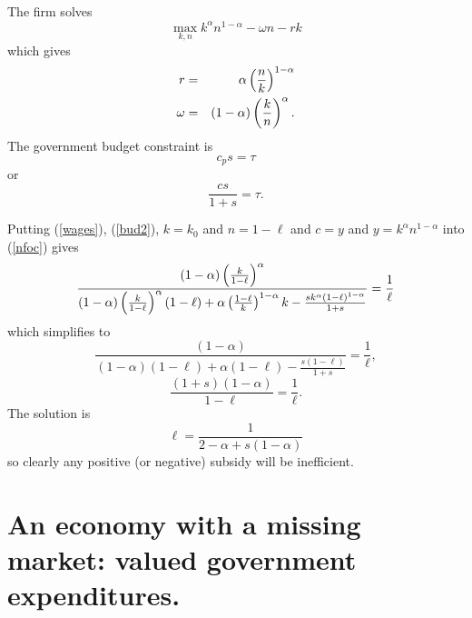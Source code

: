 \documentclass{sebase}
\begin{document}
The firm solves%
\begin{equation*}
\underset{k,n}{\max }k^{\alpha }n^{1-\alpha }-\omega n-rk
\end{equation*}%
which gives 
\begin{eqnarray}
r &=&\alpha \left( \frac{n}{k}\right) ^{1-\alpha }  \label{wages} \\
\omega &=&\left( 1-\alpha \right) \left( \frac{k}{n}\right) ^{\alpha }. 
\notag
\end{eqnarray}%
The government budget constraint is%
\begin{equation*}
c_{p}s=\tau
\end{equation*}%
or 
\begin{equation}
\frac{cs}{1+s}=\tau .  \label{bud2}
\end{equation}%
\pagebreak

Putting (\ref{wages}), (\ref{bud2}), $k=k_{0}$ and $n=1-\ell $ and $c=y$ and 
$y=k^{\alpha }n^{1-\alpha }$ into (\ref{nfoc}) gives 
\begin{equation*}
\frac{\left( 1-\alpha \right) \left( \frac{k}{1-\ell }\right) ^{\alpha }}{%
\left( 1-\alpha \right) \left( \frac{k}{1-\ell }\right) ^{\alpha }\left(
1-\ell \right) +\alpha \left( \frac{1-\ell }{k}\right) ^{1-\alpha }k-\frac{%
sk^{\alpha }\left( 1-\ell \right) ^{1-\alpha }}{1+s}}=\frac{1}{\ell }
\end{equation*}%
which simplifies to 
\begin{equation*}
\frac{\left( 1-\alpha \right) }{\left( 1-\alpha \right) \left( 1-\ell
\right) +\alpha \left( 1-\ell \right) -\frac{s\left( 1-\ell \right) }{1+s}}=%
\frac{1}{\ell },
\end{equation*}%
\begin{equation*}
\frac{\left( 1+s\right) \left( 1-\alpha \right) }{1-\ell }=\frac{1}{\ell }.
\end{equation*}%
The solution is 
\begin{equation*}
\ell =\frac{1}{2-\alpha +s\left( 1-\alpha \right) }
\end{equation*}%
so clearly any positive (or negative) subsidy will be inefficient. \pagebreak

\section{An economy with a missing market: valued government expenditures.}
\end{document}

